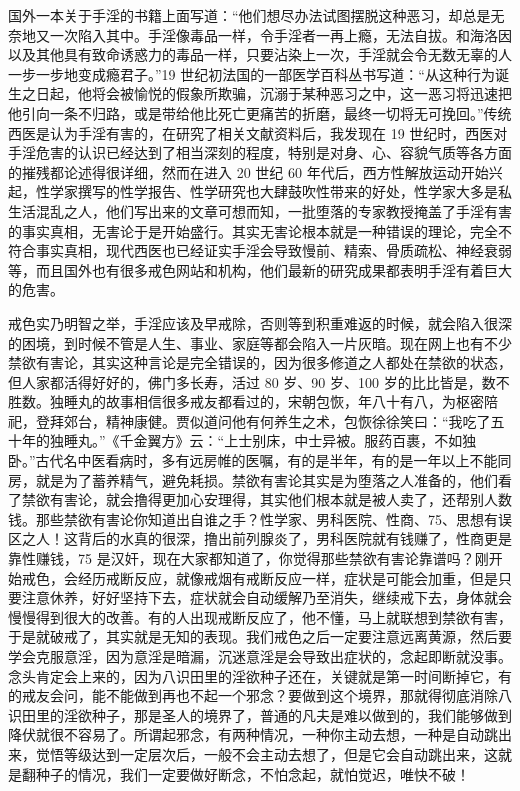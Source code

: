 国外一本关于手淫的书籍上面写道：“他们想尽办法试图摆脱这种恶习，却总是无奈地又一次陷入其中。手淫像毒品一样，令手淫者一再上瘾，无法自拔。和海洛因以及其他具有致命诱惑力的毒品一样，只要沾染上一次，手淫就会令无数无辜的人一步一步地变成瘾君子。”19 世纪初法国的一部医学百科丛书写道：“从这种行为诞生之日起，他将会被愉悦的假象所欺骗，沉溺于某种恶习之中，这一恶习将迅速把他引向一条不归路，或是带给他比死亡更痛苦的折磨，最终一切将无可挽回。”传统西医是认为手淫有害的，在研究了相关文献资料后，我发现在 19 世纪时，西医对手淫危害的认识已经达到了相当深刻的程度，特别是对身、心、容貌气质等各方面的摧残都论述得很详细，然而在进入 20 世纪 60 年代后，西方性解放运动开始兴起，性学家撰写的性学报告、性学研究也大肆鼓吹性带来的好处，性学家大多是私生活混乱之人，他们写出来的文章可想而知，一批堕落的专家教授掩盖了手淫有害的事实真相，无害论于是开始盛行。其实无害论根本就是一种错误的理论，完全不符合事实真相，现代西医也已经证实手淫会导致慢前、精索、骨质疏松、神经衰弱等，而且国外也有很多戒色网站和机构，他们最新的研究成果都表明手淫有着巨大的危害。

戒色实乃明智之举，手淫应该及早戒除，否则等到积重难返的时候，就会陷入很深的困境，到时候不管是人生、事业、家庭等都会陷入一片灰暗。现在网上也有不少禁欲有害论，其实这种言论是完全错误的，因为很多修道之人都处在禁欲的状态，但人家都活得好好的，佛门多长寿，活过 80 岁、90 岁、100 岁的比比皆是，数不胜数。独睡丸的故事相信很多戒友都看过的，宋朝包恢，年八十有八，为枢密陪祀，登拜郊台，精神康健。贾似道问他有何养生之术，包恢徐徐笑曰：“我吃了五十年的独睡丸。”《千金翼方》云：“上士别床，中士异被。服药百裹，不如独卧。”古代名中医看病时，多有远房帷的医嘱，有的是半年，有的是一年以上不能同房，就是为了蓄养精气，避免耗损。禁欲有害论其实是为堕落之人准备的，他们看了禁欲有害论，就会撸得更加心安理得，其实他们根本就是被人卖了，还帮别人数钱。那些禁欲有害论你知道出自谁之手？性学家、男科医院、性商、75、思想有误区之人！这背后的水真的很深，撸出前列腺炎了，男科医院就有钱赚了，性商更是靠性赚钱，75 是汉奸，现在大家都知道了，你觉得那些禁欲有害论靠谱吗？刚开始戒色，会经历戒断反应，就像戒烟有戒断反应一样，症状是可能会加重，但是只要注意休养，好好坚持下去，症状就会自动缓解乃至消失，继续戒下去，身体就会慢慢得到很大的改善。有的人出现戒断反应了，他不懂，马上就联想到禁欲有害，于是就破戒了，其实就是无知的表现。我们戒色之后一定要注意远离黄源，然后要学会克服意淫，因为意淫是暗漏，沉迷意淫是会导致出症状的，念起即断就没事。念头肯定会上来的，因为八识田里的淫欲种子还在，关键就是第一时间断掉它，有的戒友会问，能不能做到再也不起一个邪念？要做到这个境界，那就得彻底消除八识田里的淫欲种子，那是圣人的境界了，普通的凡夫是难以做到的，我们能够做到降伏就很不容易了。所谓起邪念，有两种情况，一种你主动去想，一种是自动跳出来，觉悟等级达到一定层次后，一般不会主动去想了，但是它会自动跳出来，这就是翻种子的情况，我们一定要做好断念，不怕念起，就怕觉迟，唯快不破！


